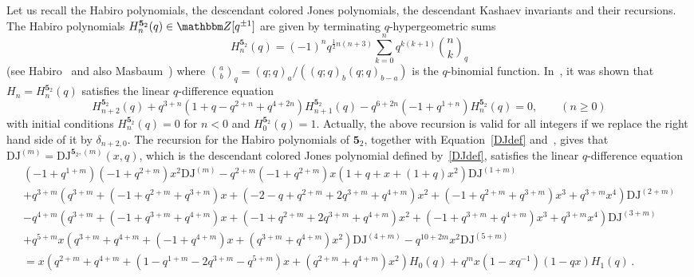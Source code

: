 \documentclass[12pt,reqno]{amsart}
\theoremstyle{definition}
\def\BZ{\mathbbm Z}
\def\be{\begin{equation}}
\def\ee{\end{equation}}
\def\DJ{\mathrm{DJ}}
\def\md{\mathbf}
\newcommand{\knot}[1]{\md{#1}}
\begin{document}
Let us recall the Habiro polynomials, the descendant colored Jones
polynomials, the descendant Kashaev invariants and their recursions.   
The Habiro polynomials $H_n^{\knot{5}_2}(q) \in \BZ[q^{\pm 1}]$ are given by terminating
$q$-hypergeometric sums 
\be
\label{Hk52}
H_n^{\knot{5}_2}(q) = (-1)^n q^{\frac{1}{2}n(n+3)}
\sum_{k=0}^n q^{k(k+1)} \binom{n}{k}_q
\ee
(see Habiro~\cite{Ha} and also Masbaum~\cite{Mas:HabPol}) 
where $\binom{a}{b}_q = (q;q)_a/((q;q)_b (q;q)_{b-a})$ is the $q$-binomial function.
In~\cite{GS:Cpoly}, it was shown that $H_n=H_n^{\knot{5}_2}(q)$ satisfies the linear
$q$-difference equation
\be
\label{recHk52}
H_{n+2}^{\knot{5}_2}(q) + q^{3 + n} (1 + q - q^{2 + n}
+ q^{4 + 2 n}) H_{n+1}^{\knot{5}_2}(q)
-q^{6 + 2 n} (-1 + q^{1 + n}) H_n^{\knot{5}_2}(q) =0, \qquad (n \geq 0)
\ee with initial conditions $H_n^{\knot{5}_2}(q)=0$ for $n<0$ and
$H_0^{\knot{5}_2}(q)=1$.  Actually, the above recursion is valid for all
integers if we replace the right hand side of it by $\delta_{n+2,0}$.
The recursion for the Habiro polynomials of $\knot{5}_2$, together with
Equation~\eqref{DJdef} and~\cite{Koutschan:holofunctions}, gives that
$\DJ^{(m)}=\DJ^{\knot{5}_2,(m)}(x,q)$, which is the descendant
colored Jones polynomial defined by~\eqref{DJdef}, satisfies the
linear $q$-difference equation
{\tiny
\begin{multline}
\label{recJm52x}
  (-1 + q^{1 + m}) (-1 + q^{2 + m}) x^2 \DJ^{(m)} - 
  q^{2 + m} (-1 + q^{2 + m}) x (1 + q + x + (1+ q) x^2) \DJ^{(1 + m)} \\
  + q^{3 + m} (q^{3 + m} +(- 1 + q^{2 + m} + q^{3 + m}) x +(- 2  - 
    q + q^{2 + m} + 2 q^{3 + m} + q^{4 + m}) x^2 +(-1 + 
    q^{2 + m} + q^{3 + m}) x^3 + q^{3 + m} x^4) \DJ^{(2 + m)} \\
    - 
 q^{4 + m} (q^{3 + m} +(-1 + q^{3 + m} + q^{4 + m}) x +(-1 + 
    q^{2 + m}  + 2 q^{3 + m}  + q^{4 + m} ) x^2 +(-1 + 
    q^{3 + m} + q^{4 + m}) x^3 + q^{3 + m} x^4) \DJ^{(3 + m)} \\
    + q^{5 + m} x (q^{3 + m} + q^{4 + m} +(-1 + q^{4 + m}) x + 
    (q^{3 + m} + q^{4 + m}) x^2) \DJ^{(4 + m)} - 
    q^{10 + 2 m} x^2 \DJ^{(5 + m)}
\\ = x (q^{2 + m} + q^{4 + m} + (1 - q^{1 + m} - 2 q^{3 + m} - 
    q^{5 + m}) x + (q^{2 + m} + q^{4 + m}) x^2) H_0(q) + 
 q^m x (1 - x q^{-1}) (1 - q x) H_1(q) \,.
\end{multline}
}
\end{document}
